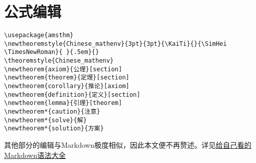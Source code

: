 \part{公式编辑}
\begin{lstlisting}[style = LaTeX_TeXworks]
\usepackage{amsthm}
\newtheoremstyle{Chinese_mathenv}{3pt}{3pt}{\KaiTi}{}{\SimHei \TimesNewRoman}{ }{.5em}{}
\theoremstyle{Chinese_mathenv}
\newtheorem{axiom}{公理}[section]
\newtheorem{theorem}{定理}[section]
\newtheorem{corollary}{推论}[axiom]
\newtheorem{definition}{定义}[section]
\newtheorem{lemma}{引理}[theorem]
\newtheorem*{caution}{注意}
\newtheorem*{solve}{解}
\newtheorem*{solution}{方案}
\end{lstlisting}
其他部分的编辑与Markdown极度相似，因此本文便不再赘述。详见\href{https://blog.csdn.net/weixin_46390192/article/details/133612181}{给自己看的Markdown语法大全}